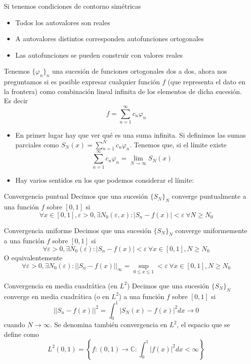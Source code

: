 \begin{theorem}
Si tenemos condiciones de contorno simétricas
\begin{itemize}
\item Todos los autovalores son reales
\item A autovalores distintos corresponden autofunciones ortogonales
\item Las autofunciones se pueden construir con valores reales
\end{itemize}
\end{theorem}
Tenemos $\{\varphi_n\}_n$ una sucesión de funciones ortogonales dos a dos, ahora nos preguntamos si es posible expresar cualquier función $f$ (que representa el dato en la frontera) como combinación lineal infinita de los elementos de dicha sucesión. Es decir
$$f=\sum_{n=1}^\infty c_n\varphi_n$$
\begin{itemize}
\item En primer lugar hay que ver qué es una suma infinita. Si definimos las sumas parciales como $S_N(x) = \sum_{n=1}^N c_n\varphi_n$. Tenemos que, si el límite existe
$$\sum_{n=1}^\infty c_n\varphi_n=\lim_{N\to\infty}S_N(x)$$
\item Hay varios sentidos en los que podemos considerar el límite:
\end{itemize}

\begin{mathresult}{Convergencia puntual}
Decimos que una sucesión $\{S_N\}_N$ converge puntualmente a una función $f$ sobre $[0,1]$ si
$$\forall x\in[0,1], \varepsilon>0, \exists N_0(\varepsilon, x) : |S_n-f(x)| < \varepsilon \ \forall N\ge N_0$$
\end{mathresult}

\begin{mathresult}{Convergencia uniforme}
Decimos que una sucesión $\{S_N\}_N$ converge uniformemente a una función $f$ sobre $[0,1]$ si
$$\forall \varepsilon>0, \exists N_0(\varepsilon) : |S_n-f(x)| < \varepsilon \ \forall x\in[0,1], N\ge N_0$$
O equivalentemente
$$\forall \varepsilon>0, \exists N_0(\varepsilon) : ||S_n-f(x)||_\infty = \sup_{0\le x \le 1} < \varepsilon\ \forall x\in[0,1], N\ge N_0$$
\end{mathresult}

\begin{mathresult}{Convergencia en media cuadrática (en $L^2$)}
Decimos que una sucesión $\{S_N\}_N$ converge en media cuadrática (o en $L^2$) a una función $f$ sobre $[0,1]$ si
$$||S_n-f(x)||^2 = \int_0^1 |S_N(x)-f(x)|^2dx\to 0$$
cuando $N\to\infty$.
Se denomina también convergencia en $L^2$, el espacio que se define como
$$L^2(0,1)=\left\{f:(0,1)\longrightarrow\mathbb{C}: \int_0^1|f(x)|^2dx < \infty\right\}$$
\end{mathresult}

